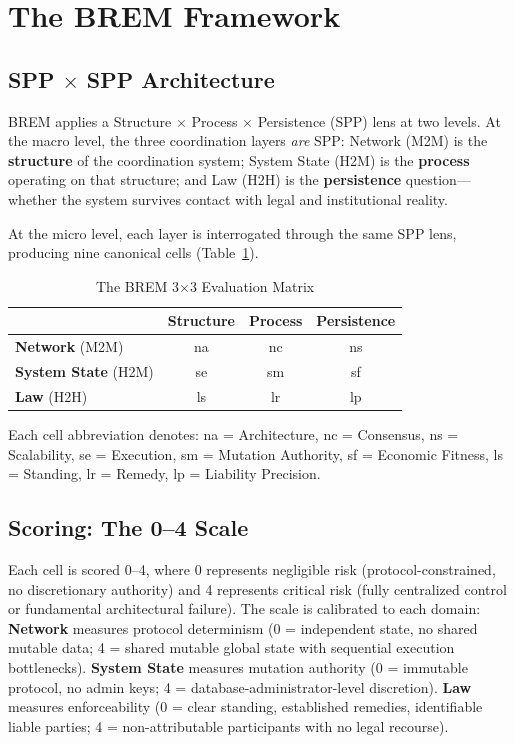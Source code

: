 \documentclass[conference]{IEEEtran}
\begin{document}
\section{The BREM Framework}

\subsection{SPP $\times$ SPP Architecture}

BREM applies a Structure $\times$ Process $\times$ Persistence (SPP) lens at two levels. At the macro level, the three coordination layers \textit{are} SPP: Network (M2M) is the \textbf{structure} of the coordination system; System State (H2M) is the \textbf{process} operating on that structure; and Law (H2H) is the \textbf{persistence} question---whether the system survives contact with legal and institutional reality.

At the micro level, each layer is interrogated through the same SPP lens, producing nine canonical cells (Table~\ref{tab:matrix}).

\begin{table}[htbp]
\caption{The BREM 3$\times$3 Evaluation Matrix}
\label{tab:matrix}
\centering
\begin{tabular}{lccc}
\toprule
& \textbf{Structure} & \textbf{Process} & \textbf{Persistence} \\
\midrule
\textbf{Network} (M2M) & na & nc & ns \\
\textbf{System State} (H2M) & se & sm & sf \\
\textbf{Law} (H2H) & ls & lr & lp \\
\bottomrule
\end{tabular}
\end{table}

\noindent Each cell abbreviation denotes: na = Architecture, nc = Consensus, ns = Scalability, se = Execution, sm = Mutation Authority, sf = Economic Fitness, ls = Standing, lr = Remedy, lp = Liability Precision.

\subsection{Scoring: The 0--4 Scale}

Each cell is scored 0--4, where 0 represents negligible risk (protocol-constrained, no discretionary authority) and 4 represents critical risk (fully centralized control or fundamental architectural failure). The scale is calibrated to each domain: \textbf{Network} measures protocol determinism (0 = independent state, no shared mutable data; 4 = shared mutable global state with sequential execution bottlenecks). \textbf{System State} measures mutation authority (0 = immutable protocol, no admin keys; 4 = database-administrator-level discretion). \textbf{Law} measures enforceability (0 = clear standing, established remedies, identifiable liable parties; 4 = non-attributable participants with no legal recourse).
\end{document}
